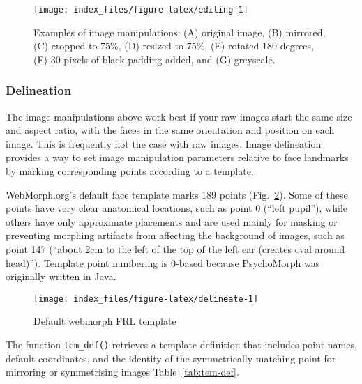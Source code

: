 \documentclass[
  doc,floatsintext]{apa6}
\begin{document}
\begin{figure}
\texttt{[image: index\_files/figure-latex/editing-1]} \caption{Examples of image manipulations: (A) original image, (B) mirrored, (C) cropped to 75\%, (D) resized to 75\%, (E) rotated 180 degrees, (F) 30 pixels of black padding added, and (G) greyscale.}\label{fig:editing}
\end{figure}

\hypertarget{delineation}{%
\subsubsection{Delineation}\label{delineation}}

The image manipulations above work best if your raw images start the same size and aspect ratio, with the faces in the same orientation and position on each image. This is frequently not the case with raw images. Image delineation provides a way to set image manipulation parameters relative to face landmarks by marking corresponding points according to a template.

WebMorph.org's default face template marks 189 points (Fig.~\ref{fig:delineate}). Some of these points have very clear anatomical locations, such as point 0 (``left pupil''), while others have only approximate placements and are used mainly for masking or preventing morphing artifacts from affecting the background of images, such as point 147 (``about 2cm to the left of the top of the left ear (creates oval around head)''). Template point numbering is 0-based because PsychoMorph was originally written in Java.

\begin{figure}
\texttt{[image: index\_files/figure-latex/delineate-1]} \caption{Default webmorph FRL template}\label{fig:delineate}
\end{figure}

The function \texttt{tem\_def()} retrieves a template definition that includes point names, default coordinates, and the identity of the symmetrically matching point for mirroring or symmetrising images Table~\ref{tab:tem-def}.
\end{document}
